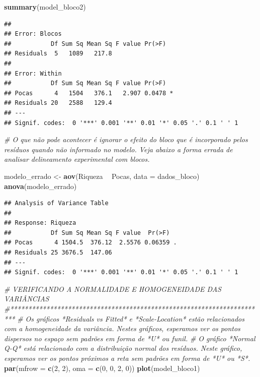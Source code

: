 \documentclass[
]{book}
\newenvironment{Shaded}{\begin{snugshade}}{\end{snugshade}}
\newcommand{\CommentTok}[1]{\textcolor[rgb]{0.56,0.35,0.01}{\textit{#1}}}
\newcommand{\DataTypeTok}[1]{\textcolor[rgb]{0.13,0.29,0.53}{#1}}
\newcommand{\DecValTok}[1]{\textcolor[rgb]{0.00,0.00,0.81}{#1}}
\newcommand{\KeywordTok}[1]{\textcolor[rgb]{0.13,0.29,0.53}{\textbf{#1}}}
\newcommand{\NormalTok}[1]{#1}
\newcommand{\OperatorTok}[1]{\textcolor[rgb]{0.81,0.36,0.00}{\textbf{#1}}}
\newcommand{\StringTok}[1]{\textcolor[rgb]{0.31,0.60,0.02}{#1}}
\begin{document}
\begin{Shaded}
\begin{Highlighting}[]
\KeywordTok{summary}\NormalTok{(model_bloco2)}
\end{Highlighting}
\end{Shaded}

\begin{verbatim}
## 
## Error: Blocos
##           Df Sum Sq Mean Sq F value Pr(>F)
## Residuals  5   1089   217.8               
## 
## Error: Within
##           Df Sum Sq Mean Sq F value Pr(>F)  
## Pocas      4   1504   376.1   2.907 0.0478 *
## Residuals 20   2588   129.4                 
## ---
## Signif. codes:  0 '***' 0.001 '**' 0.01 '*' 0.05 '.' 0.1 ' ' 1
\end{verbatim}

\begin{Shaded}
\begin{Highlighting}[]
\CommentTok{# O que não pode acontecer é ignorar o efeito do bloco que é incorporado pelos resíduos quando não informado no modelo. Veja abaixo a forma errada de analisar delineamento experimental com blocos.}

\NormalTok{modelo_errado <-}\StringTok{ }\KeywordTok{aov}\NormalTok{(Riqueza }\OperatorTok{~}\StringTok{ }\NormalTok{Pocas, }\DataTypeTok{data =}\NormalTok{ dados_bloco)}
\KeywordTok{anova}\NormalTok{(modelo_errado)}
\end{Highlighting}
\end{Shaded}

\begin{verbatim}
## Analysis of Variance Table
## 
## Response: Riqueza
##           Df Sum Sq Mean Sq F value  Pr(>F)  
## Pocas      4 1504.5  376.12  2.5576 0.06359 .
## Residuals 25 3676.5  147.06                  
## ---
## Signif. codes:  0 '***' 0.001 '**' 0.01 '*' 0.05 '.' 0.1 ' ' 1
\end{verbatim}

\begin{Shaded}
\begin{Highlighting}[]
\CommentTok{# VERIFICANDO A NORMALIDADE E HOMOGENEIDADE DAS VARIÂNCIAS}
\CommentTok{#***********************************************************************}
\CommentTok{# Os gráficos *Residuals vs Fitted* e *Scale-Location* estão relacionados com a homogeneidade da variância. Nestes gráficos, esperamos ver os pontos dispersos no espaço sem padrões em forma de *U* ou funil. }
\CommentTok{# O gráfico *Normal Q-Q* está relacionado com a distribuição normal dos resíduos. Neste gráfico, esperamos ver os pontos próximos a reta sem padrões em forma de *U* ou *S*. }
\KeywordTok{par}\NormalTok{(}\DataTypeTok{mfrow =} \KeywordTok{c}\NormalTok{(}\DecValTok{2}\NormalTok{, }\DecValTok{2}\NormalTok{), }\DataTypeTok{oma =} \KeywordTok{c}\NormalTok{(}\DecValTok{0}\NormalTok{, }\DecValTok{0}\NormalTok{, }\DecValTok{2}\NormalTok{, }\DecValTok{0}\NormalTok{))}
\KeywordTok{plot}\NormalTok{(model_bloco1)}
\end{Highlighting}
\end{Shaded}
\end{document}
